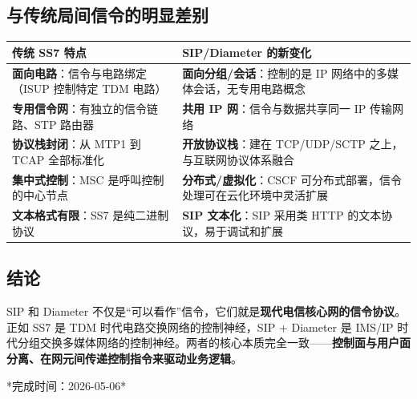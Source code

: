 \documentclass[12pt,a4paper]{ctexart}
\begin{document}
\subsection*{与传统局间信令的明显差别}
\begin{table}[htbp]
\centering
\scriptsize
\begin{tabular}{p{5.5cm} p{8.5cm}}
\toprule
\textbf{传统 SS7 特点} & \textbf{SIP/Diameter 的新变化} \\
\midrule
\textbf{面向电路}：信令与电路绑定（ISUP 控制特定 TDM 电路） &
\textbf{面向分组/会话}：控制的是 IP 网络中的多媒体会话，无专用电路概念 \\
\addlinespace
\textbf{专用信令网}：有独立的信令链路、STP 路由器 &
\textbf{共用 IP 网}：信令与数据共享同一 IP 传输网络 \\
\addlinespace
\textbf{协议栈封闭}：从 MTP1 到 TCAP 全部标准化 &
\textbf{开放协议栈}：建在 TCP/UDP/SCTP 之上，与互联网协议体系融合 \\
\addlinespace
\textbf{集中式控制}：MSC 是呼叫控制的中心节点 &
\textbf{分布式/虚拟化}：CSCF 可分布式部署，信令处理可在云化环境中灵活扩展 \\
\addlinespace
\textbf{文本格式有限}：SS7 是纯二进制协议 &
\textbf{SIP 文本化}：SIP 采用类 HTTP 的文本协议，易于调试和扩展 \\
\bottomrule
\end{tabular}
\end{table}

\subsection*{结论}
SIP 和 Diameter 不仅是“可以看作”信令，它们就是\textbf{现代电信核心网的信令协议}。正如 SS7 是 TDM 时代电路交换网络的控制神经，SIP + Diameter 是 IMS/IP 时代分组交换多媒体网络的控制神经。两者的核心本质完全一致——\textbf{控制面与用户面分离、在网元间传递控制指令来驱动业务逻辑}。

\vfill
\centering
\small
*完成时间：2026-05-06*
\end{document}
